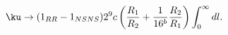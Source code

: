 \begin{equation}
\ku \rightarrow (1_{RR}-1_{NSNS}) 2^9 c
\left(\frac{R_1}{R_2}+\frac{1}{16^b}\frac{R_2}{R_1}\right)
\int_0^{\infty}  dl.\label{FormulaRRtadpoleKb}
\end{equation} 
